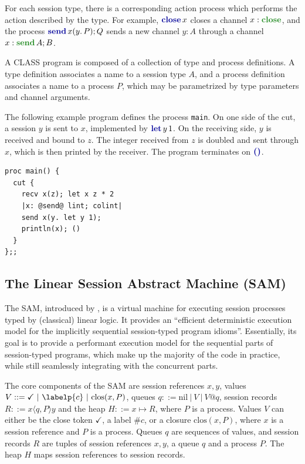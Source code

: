 \documentclass[sigconf,nonacm,natbib=true]{acmart}
\begin{document}
For each session type, there is a corresponding action process which performs the action described by the type. For example, $\closec{x}$ closes a channel $x: \closet$, and the process $\sendc{x}{y}{P}{Q}$ sends a new channel $y: A$ through a channel $x: \sendt{A}{B}$.

A \ac{CLASS} program is composed of a collection of type and process definitions. A type definition associates a name to a session type $A$, and a process definition associates a name to a process $P$, which may be parametrized by type parameters and channel arguments.

The following example program defines the process \texttt{main}. On one side of the cut, a session $y$ is sent to $x$, implemented by $\letc{y}{1}$. On the receiving side, $y$ is received and bound to $z$. The integer received from $z$ is doubled and sent through $x$, which is then printed by the receiver. The program terminates on $\emptyp$.

\begin{lstlisting}[language=CLASS]
proc main() {
  cut {
    recv x(z); let x z * 2
    |x: @send@ lint; colint|
    send x(y. let y 1);
    println(x); ()
  }
};;
\end{lstlisting}

\subsection{The Linear Session Abstract Machine (SAM)}

The \ac{SAM}, introduced by \citet{Caires:2024}, is a virtual machine for executing session processes typed by (classical) linear logic. It provides an ``efficient deterministic execution model for the implicitly sequential session-typed program idioms''. Essentially, its goal is to provide a performant execution model for the sequential parts of session-typed programs, which make up the majority of the code in practice, while still seamlessly integrating with the concurrent parts.

The core components of the \ac{SAM} are session references $x, y$, values $V ::= \checkmark\ |\ \labelp{c}\ |\ \text{clos}(x, P)$, queues $q ::= \text{nil}\ |\ V\ |\ V@q$, session records $R ::= x\langle q,P\rangle y$ and the heap $H ::= x \mapsto R$, where $P$ is a process. Values $V$ can either be the close token $\checkmark$, a label $\#c$, or a closure $\text{clos}(x, P)$, where $x$ is a session reference and $P$ is a process. Queues $q$ are sequences of values, and session records $R$ are tuples of session references $x, y$, a queue $q$ and a process $P$. The heap $H$ maps session references to session records.
\end{document}
